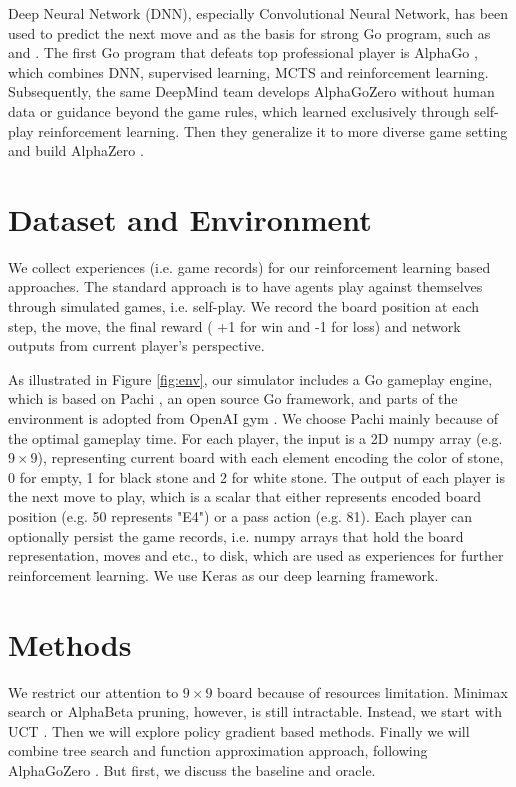\documentclass{article}
\begin{document}
Deep Neural Network (DNN), especially Convolutional Neural Network, has been used to predict the next move and as the basis for strong Go program, such as \cite{tian2015better} and \cite{maddison2014move}. The first Go program that defeats top professional player is AlphaGo \cite{silver2016mastering}, which combines DNN, supervised learning, MCTS and reinforcement learning. Subsequently, the same DeepMind team develops AlphaGoZero\cite{silver2017masteringalphagozero} without human data or guidance beyond the game rules, which learned exclusively through self-play reinforcement learning. Then they generalize it to more diverse game setting and build AlphaZero \cite{silver2017masteringalphazero}.

\section{Dataset and Environment}

We collect experiences (i.e. game records) for our reinforcement learning based approaches. The standard approach is to have agents play against themselves through simulated games, i.e. self-play. We record the board position at each step,  the move, the final reward ( +1 for win and -1 for loss) and network outputs from current player's perspective. 

As illustrated in Figure \ref{fig:env}, our simulator includes a Go gameplay engine, which is based on Pachi \cite{baudivs2011pachi}, an open source Go framework, and parts of the environment is adopted from OpenAI gym \cite{brockman2016openai}. We choose Pachi mainly because of the optimal gameplay time. For each player, the input is a 2D numpy array (e.g. $9 \times 9$), representing current board with each element encoding the color of stone, 0 for empty, 1 for black stone and 2 for white stone. The output of each player is the next move to play, which is a scalar that either represents encoded board position (e.g. 50 represents "E4") or a pass action (e.g. 81). Each player can optionally persist the game records, i.e. numpy arrays that hold the board representation, moves and etc., to disk, which are used as experiences for further reinforcement learning. We use Keras \cite{chollet2015keras} as our deep learning framework. 

\section{Methods}
We restrict our attention to $9 \times 9$ board because of resources limitation. Minimax search or AlphaBeta pruning, however, is still intractable. Instead, we start with UCT \cite{kocsis2006bandit}. Then we will explore policy gradient based methods. Finally we will combine tree search and function approximation approach, following AlphaGoZero \cite{silver2017masteringalphagozero}.  But first, we discuss the baseline and oracle.
\end{document}

